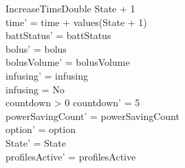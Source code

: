 \begin{schema}{IncreaseTimeDouble}
	State + 1 \\
	time' = time + values(State + 1)\\
	battStatus' = battStatus\\
	bolus' = bolus\\
	bolusVolume' = bolusVolume\\
	infusing' = infusing\\
	infusing = No\\
	countdown > 0 \land countdown' = 5\\
	powerSavingCount' = powerSavingCount\\ 
	option' = option\\
State' = State\\
profilesActive' = profilesActive
\end{schema}

